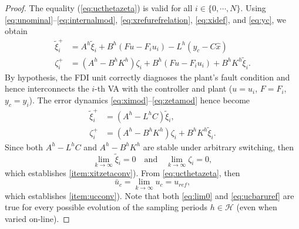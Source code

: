 \documentclass[letterpaper, 10 pt, conference]{ieeeconf}
\newcommand{\Hset}{\mathcal{H}}
\begin{document}
\begin{proof}
  The equality (\ref{eq:ucthetazeta}) is valid for all
  $i\in\{0,\cdots,N\}$.  Using
  \eqref{eq:unominal}--\eqref{eq:internalmod},
  \eqref{eq:xrefurefrelation}, \eqref{eq:xidef}, and \eqref{eq:yc}, we
  obtain
  \begin{align}
    \label{eq:ximod}
      \tilde{\xi}^+_i &= A^h \tilde{\xi}_i+B^h(Fu-F_iu_i)-L^h(y_c-C\hat{x})\\
    \label{eq:zetamod}
    \zeta_i^+ &= (A^h-B^hK^h)\zeta_i +
      B^h(Fu-F_iu_i)+ B^hK^h\tilde{\xi}_i.
  \end{align}
  By hypothesis, the FDI unit correctly diagnoses the plant's fault
  condition and hence interconnects the $i$-th VA with the controller and plant ($u=u_i$, $F=F_i$, $y_c = y_i$). The error dynamics 
  \eqref{eq:ximod}--\eqref{eq:zetamod} hence become
  \begin{align}
    \label{eq:ximodsel}
    \tilde{\xi}^+_i &= (A^h-L^hC)\tilde{\xi}_i,\\
    \label{eq:zetamodsel}
    \zeta_i^+ &= (A^h-B^hK^h)\zeta_i+B^hK^h\tilde{\xi}_i.
  \end{align}
  Since both $A^h - L^h C$ and $A^h-B^hK^h$ are stable under arbitrary
  switching, then
  \begin{equation}
    \label{eq:lim0}
    \lim_{k\to\infty} \tilde\xi_i = 0\quad\text{and}\quad
    \lim_{k\to\infty} \zeta_i = 0,
  \end{equation}
  which establishes \ref{item:xitzetaconv}). From
  \eqref{eq:ucthetazeta}, then
  \begin{equation}
    \label{eq:ucbaruref}
    \bar u_c = \lim_{k\to\infty} u_c = u_{ref},
  \end{equation}
  which establishes \ref{item:ucconv}). Note that both \eqref{eq:lim0}
  and \eqref{eq:ucbaruref} are true for every possible evolution of
  the sampling periods $h\in\Hset$ (even when varied on-line).
\end{proof}
\end{document}
